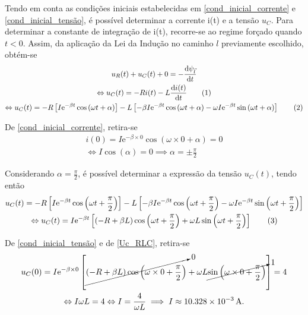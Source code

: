 \documentclass[a4paper, titlepage, portuguese]{article}
\newcommand{\eq}{\Leftrightarrow} %
\newcommand\numberthis{\addtocounter{equation}{1}\tag{\theequation}}
\newcommand\e{\mathrm{e} }
\begin{document}
		Tendo em conta as condições iniciais estabelecidas em \eqref{cond_inicial_corrente} e \eqref{cond_inicial_tensão}, é possível determinar a corrente i(t) e a tensão $u_{C}$. Para determinar a constante de integração de i(t), recorre-se ao regime forçado quando $t < 0$. Assim, da aplicação da Lei da Indução no caminho $l$ previamente escolhido, obtém-se
		\begin{gather*}
			u_R(t) + u_C(t) + 0 = - \dv{\psi_{\vec{l}}}{t} \\ \eq
			u_C(t) = -Ri(t) - L\dv{i(t)}{t} \numberthis \label{eq_Uc_lei_ind} \\ \eq
			u_C(t) = -R \left[ I\e^{-\beta t} \cos{(\omega t + \alpha)} \right] - L \left[ -\beta I\e^{-\beta t} \cos{(\omega t + \alpha)} - \omega I\e^{-\beta t} \sin{(\omega t + \alpha)}\right] \numberthis \label{eq_Uc_RLC}
		\end{gather*}

		De \eqref{cond_inicial_corrente}, retira-se
		\begin{gather*}
			 i(0) = I\e^{-\beta \times 0} \cos{(\omega \times 0 + \alpha)} = 0 \\ \eq
			 I\cos{(\alpha)} = 0 \implies \alpha = \pm \frac{\pi}{2}
		\end{gather*}

		Considerando $\alpha =  \frac{\pi}{2}$, é possível determinar a expressão da tensão $u_{C}(t)$, tendo então
		\begin{gather*}
			u_C(t) = -R \left[ I\e^{-\beta t} \cos{\left(\omega t + \frac{\pi}{2}\right)} \right] - L \left[ -\beta I\e^{-\beta t} \cos{\left(\omega t + \frac{\pi}{2}\right)} - \omega I\e^{-\beta t} \sin{\left(\omega t + \frac{\pi}{2}\right)}\right] \\ \eq
			u_C(t) = I\e^{-\beta t} \left[ \left( -R +\beta L\right) \cos{\left(\omega t + \frac{\pi}{2}\right)}  + \omega L\sin{\left(\omega t + \frac{\pi}{2}\right)} \right] \numberthis \label{Uc_RLC}
			\end{gather*}

		De \eqref{cond_inicial_tensão} e de \eqref{Uc_RLC}, retira-se
		\begin{gather*}
			u_{C}(0) = I\e^{-\beta \times 0} \left[ \cancelto{0}{\left( -R +\beta L\right) \cos{\left(\omega \times 0 + \frac{\pi}{2}\right)}}  + \omega L \cancelto{1}{\sin{\left(\omega \times 0 + \frac{\pi}{2}\right)}} \right] = 4 \\ \eq
			 I\omega L = 4 \eq I = \frac{4}{\omega L} \implies I \approx \SI{10.328e-3}{\ampere}.
		\end{gather*}
\end{document}
